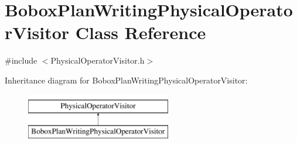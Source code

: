\hypertarget{class_bobox_plan_writing_physical_operator_visitor}{\section{Bobox\+Plan\+Writing\+Physical\+Operator\+Visitor Class Reference}
\label{class_bobox_plan_writing_physical_operator_visitor}
}


{\ttfamily \#include $<$Physical\+Operator\+Visitor.\+h$>$}

Inheritance diagram for Bobox\+Plan\+Writing\+Physical\+Operator\+Visitor\+:\begin{figure}[H]
\begin{center}
\leavevmode
\includegraphics[height=2.000000cm]{class_bobox_plan_writing_physical_operator_visitor}
\end{center}
\end{figure}
